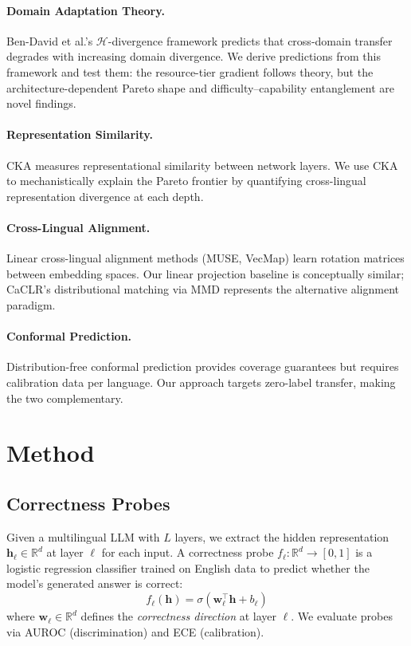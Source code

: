 \documentclass[11pt,a4paper]{article}
\begin{document}
\paragraph{Domain Adaptation Theory.}
Ben-David et al.'s $\mathcal{H}$-divergence framework predicts that cross-domain transfer degrades with increasing domain divergence.
We derive predictions from this framework and test them: the resource-tier gradient follows theory, but the architecture-dependent Pareto shape and difficulty--capability entanglement are novel findings.

\paragraph{Representation Similarity.}
CKA \cite{kornblith2019similarity} measures representational similarity between network layers.
We use CKA to mechanistically explain the Pareto frontier by quantifying cross-lingual representation divergence at each depth.

\paragraph{Cross-Lingual Alignment.}
Linear cross-lingual alignment methods (MUSE, VecMap) learn rotation matrices between embedding spaces.
Our linear projection baseline is conceptually similar; CaCLR's distributional matching via MMD represents the alternative alignment paradigm.

\paragraph{Conformal Prediction.}
Distribution-free conformal prediction provides coverage guarantees but requires calibration data per language.
Our approach targets zero-label transfer, making the two complementary.


\section{Method}
\label{sec:method}

\subsection{Correctness Probes}
\label{sec:method:probes}

Given a multilingual LLM with $L$ layers, we extract the hidden representation $\mathbf{h}_\ell \in \mathbb{R}^d$ at layer $\ell$ for each input.
A correctness probe $f_\ell: \mathbb{R}^d \to [0,1]$ is a logistic regression classifier trained on English data to predict whether the model's generated answer is correct:
\begin{equation}
    f_\ell(\mathbf{h}) = \sigma(\mathbf{w}_\ell^\top \mathbf{h} + b_\ell)
\end{equation}
where $\mathbf{w}_\ell \in \mathbb{R}^d$ defines the \emph{correctness direction} at layer $\ell$.
We evaluate probes via AUROC (discrimination) and ECE (calibration).
\end{document}
